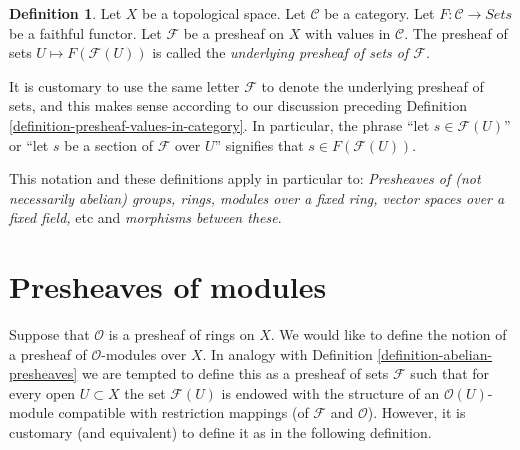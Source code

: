 \documentclass{stacks-project}
\theoremstyle{plain}
\theoremstyle{definition}
\newtheorem{definition}[subsection]{Definition}
\theoremstyle{remark}
\numberwithin{equation}{subsection}
\begin{document}
\begin{definition}
\label{definition-underlying-presheaf-sets}
Let $X$ be a topological space. Let $\mathcal{C}$ be a category.
Let $F : \mathcal{C} \to \textit{Sets}$ be a faithful functor.
Let $\mathcal{F}$ be a presheaf on $X$ with values in $\mathcal{C}$.
The presheaf of sets $U \mapsto F(\mathcal{F}(U))$
is called the {\it underlying presheaf of sets of $\mathcal{F}$}.
\end{definition}

\noindent
It is customary to use the same letter $\mathcal{F}$ to denote
the underlying presheaf of sets, and this makes
sense according to our discussion preceding
Definition \ref{definition-presheaf-values-in-category}.
In particular, the phrase ``let $s \in \mathcal{F}(U)$''
or ``let $s$ be a section of $\mathcal{F}$ over $U$'' signifies
that $s \in F(\mathcal{F}(U))$.

\medskip\noindent
This notation and these definitions apply in particular to:
{\it Presheaves of (not necessarily abelian) groups, rings, modules
over a fixed ring, vector spaces over a fixed field, } etc and
{\it morphisms between these}.

\section{Presheaves of modules}
\label{section-presheaves-modules}

\noindent
Suppose that $\mathcal{O}$ is a presheaf of rings on $X$.
We would like to define the notion of a presheaf of
$\mathcal{O}$-modules over $X$. In analogy with Definition
\ref{definition-abelian-presheaves} we are tempted to define
this as a presheaf of sets $\mathcal{F}$ such that for every open
$U \subset X$ the set $\mathcal{F}(U)$ is endowed with the structure
of an $\mathcal{O}(U)$-module compatible with restriction mappings
(of $\mathcal{F}$ and $\mathcal{O}$). However, it is customary
(and equivalent) to define it as in the following definition.
\end{document}
